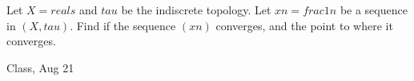 \begin{samepage}
\begin{ex}
Let $X = reals$ and $tau$ be the indiscrete topology. 
Let $xn = frac{1}{n}$ be a sequence in $(X, tau)$.
Find if the sequence $(xn)$ converges, and the point to where it converges.
\end{ex}
\begin{source}
Class, Aug 21
\end{source}
\end{samepage}
